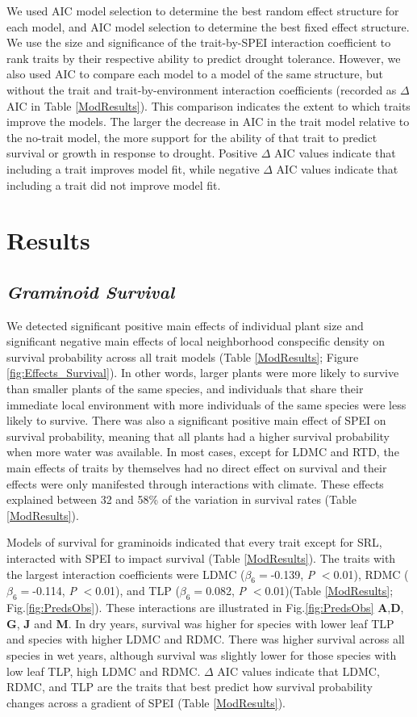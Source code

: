 \documentclass[12pt, letterpaper]{article}
\begin{document}
We used AIC model selection to determine the best random effect structure for each model, and AIC model selection to determine the best fixed effect structure. We use the size and significance of the trait-by-SPEI interaction coefficient to rank traits by their respective ability to predict drought tolerance. However, we also used AIC to compare each model to a model of the same structure, but without the trait and trait-by-environment interaction coefficients (recorded as $\Delta$ AIC in Table \ref{ModResults}). This comparison indicates the extent to which traits improve the models. The larger the decrease in AIC in the trait model relative to the no-trait model, the more support for the ability of that trait to predict survival or growth in response to drought. Positive $\Delta$ AIC values indicate that including a trait improves model fit, while negative $\Delta$ AIC values indicate that including a trait did not improve model fit.

\section{Results}
\subsection{\textit{Graminoid Survival}} We detected significant positive main effects of individual plant size and significant negative main effects of local neighborhood conspecific density on survival probability across all trait models (Table \ref{ModResults}; Figure \ref{fig:Effects_Survival}). In other words, larger plants were more likely to survive than smaller plants of the same species, and individuals that share their immediate local environment with more individuals of the same species were less likely to survive. There was also a significant positive main effect of SPEI on survival probability, meaning that all plants had a higher survival probability when more water was available. In most cases, except for LDMC and RTD, the main effects of traits by themselves had no direct effect on survival and their effects were only manifested through interactions with climate. These effects explained between 32 and 58\% of the variation in survival rates (Table \ref{ModResults}). 

Models of survival for graminoids indicated that every trait except for SRL, interacted with SPEI to impact survival (Table \ref{ModResults}). The traits with the largest interaction coefficients were LDMC ($\beta _6=$-0.139,  \textit{P} $<$0.01), RDMC ($\beta _6=$-0.114,  \textit{P} $<$0.01), and TLP ($\beta _6=$0.082,  \textit{P} $<$0.01)(Table \ref{ModResults}; Fig.\ref{fig:PredsObs}). These interactions are illustrated in Fig.\ref{fig:PredsObs} \textbf{A},\textbf{D}, \textbf{G}, \textbf{J} and \textbf{M}. In dry years, survival was higher for species with lower leaf TLP and species with higher LDMC and RDMC. There was higher survival across all species in wet years, although survival was slightly lower for those species with low leaf TLP, high LDMC and RDMC. $\Delta$ AIC values indicate that LDMC, RDMC, and TLP are the traits that best predict how survival probability changes across a gradient of SPEI (Table \ref{ModResults}). 
\end{document}
